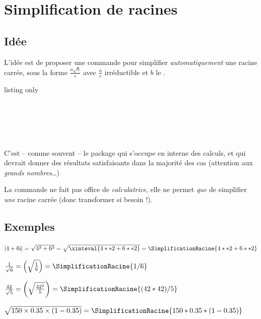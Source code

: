 \documentclass[a4paper,french,11pt]{article}
\newcommand\ctex[1]{\tcbox[vignettelatex]{#1}}
\newcommand\cmaj[1]{%
	{\tcbox[vignetteMaJ]{#1}\xspace}%
}
\begin{document}
\newpage

\section{Simplification de racines}\label{simplracine}

\subsection{Idée}

\begin{tipblock}
\cmaj{2.1.0} L'idée est de proposer une commande pour simplifier \textit{automatiquement} une racine carrée, sous la forme $\frac{a\sqrt{b}}{c}$ avec $\frac{a}{c}$ irréductible et $b$ le .
\end{tipblock}

\begin{PresCodeTexPL}{listing only}
\end{PresCodeTexPL}

\begin{PresCodePL}{}
 \\ \\
 \\ \\
\end{PresCodePL}

\begin{noteblock}
C'est -- comme souvent -- le package \ctex{xint} qui s'occupe en interne des calculs, et qui devrait donner des résultats satisfaisants dans la majorité des cas (attention aux \textit{grands nombres}\ldots)

\smallskip

La commande ne fait pas office de \textit{calculatrice}, elle ne permet \textit{que} de simplifier \textit{une} racine carrée (donc transformer si besoin !).
\end{noteblock}

\subsection{Exemples}

\begin{PresCodePL}{}
$\left| 4+6\text{i}\right| = \sqrt{4^2+6^2} = \sqrt{\xinteval{4**2+6**2}}=\SimplificationRacine{4**2+6**2}$

$\frac{1}{\sqrt{6}}=\left(\sqrt{\frac{1}{6}}\right)=\SimplificationRacine{1/6}$

$\frac{42}{\sqrt{5}}=\left(\sqrt{\frac{42^2}{5}}\right)=\SimplificationRacine{(42*42)/5}$

$\sqrt{\num{150}\times\num{0.35}\times(1-\num{0.35})} = \displaystyle\SimplificationRacine{150*0.35*(1-0.35)}$
\end{PresCodePL}
\end{document}
